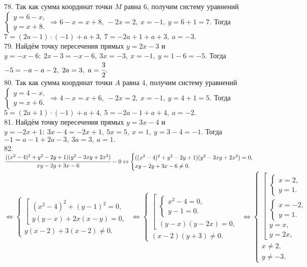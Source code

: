 78. Так как сумма координат точки $M$ равна 6, получим систему уравнений $\begin{cases} y=6-x,\\ y=x+8.\end{cases}\Rightarrow 6-x=x+8,\ -2x=2,\ x=-1,\ y=6+1=7.$ Тогда $7=(2a-1)\cdot(-1)+a+3,\ 7=-2a+1+a+3,\ a=-3.$\\
79. Найдём точку пересечения прямых $y=2x-3$ и $y=-x-6:\ 2x-3=-x-6,\ 3x=-3,\ x=-1,\ y=1-6=-5.$ Тогда $-5=-a-a-2,\ 2a=3,\ a=\cfrac{3}{2}.$\\
80. Так как сумма координат точки $A$ равна 4, получим систему уравнений $\begin{cases} y=4-x,\\ y=x+6.\end{cases}\Rightarrow 4-x=x+6,\ -2x=2,\ x=-1,\ y=4+1=5.$ Тогда $5=(2a+1)\cdot(-1)+a+4,\ 5=-2a-1+a+4,\ a=-2.$\\
81. Найдём точку пересечения прямых $y=3x-4$ и $y=-2x+1:\ 3x-4=-2x+1,\ 5x=5,\ x=1,\ y=3-4=-1.$ Тогда $-1=a-1+2a-3,\ 3a=3,\ a=1.$\\
82. $\cfrac{((x^2-4)^2+y^2-2y+1)(y^2-3xy+2x^2)}{xy-2y+3x-6}=0\Leftrightarrow
\begin{cases}

((x^2-4)^2+y^2-2y+1)(y^2-3xy+2x^2)=0,\\
xy-2y+3x-6\neq0.
\end{cases}$\\$\Leftrightarrow
\begin{cases}
\left[\begin{array}{l}
(x^2-4)^2+(y-1)^2=0,\\
y(y-x)+2x(x-y)=0,
\end{array}\right.\\
y(x-2)+3(x-2)\neq0.
\end{cases}\Leftrightarrow
\begin{cases}
\left[\begin{array}{l}
\begin{cases}
x^2-4=0,\\
y-1=0.
\end{cases}\\
(y-x)(y-2x)=0,
\end{array}\right.\\
(x-2)(y+3)\neq0.
\end{cases}\Leftrightarrow
\begin{cases}
\left[\begin{array}{l}
\begin{cases}
x=2,\\
y=1.
\end{cases}\\
\begin{cases}
x=-2,\\
y=1.
\end{cases}\\
y=x,\\
y=2x,
\end{array}\right.\\
x\neq2,\\
y\neq-3.
\end{cases}$
